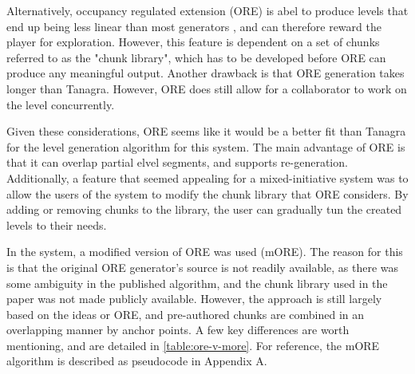 Alternatively, occupancy regulated extension (ORE) is abel to produce levels that end up
being less linear than most generators \cite{mawhorter2010, shaker2011}, and can therefore
reward the player for exploration. However, this feature is dependent on a set of chunks 
referred to as the "chunk library", which has to be developed before ORE can produce
any meaningful output. Another drawback is that ORE generation takes longer than Tanagra.
However, ORE does still allow for a collaborator to work on the level concurrently.

Given these considerations, ORE seems like it would be a better fit than Tanagra for the
level generation algorithm for this system. The main advantage of ORE is that it can overlap
partial elvel segments, and supports re-generation. Additionally, a feature that seemed
appealing for a mixed-initiative system was to allow the users of the system to modify the
chunk library that ORE considers. By adding or removing chunks to the library, the user
can gradually tun the created levels to their needs.

In the system, a modified version of ORE was used (mORE). The reason for this is that the 
original ORE generator's source is not readily available, as there was some ambiguity in
the published algorithm, and the chunk library used in the paper was not made publicly
available. However, the approach is still largely based on the ideas or ORE, and pre-authored
chunks are combined in an overlapping manner by anchor points. A few key differences are
worth mentioning, and are detailed in \autoref{table:ore-v-more}. For reference, the mORE
algorithm is described as pseudocode in Appendix A.

